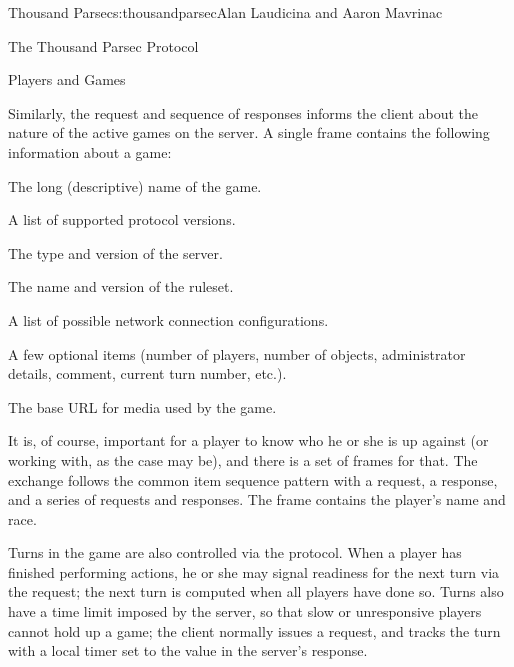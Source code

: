 \begin{aosachapter}{Thousand Parsec}{s:thousandparsec}{Alan Laudicina and Aaron Mavrinac}
\begin{aosasect1}{The Thousand Parsec Protocol}
\begin{aosasect2}{Players and Games}
\begin{aosaitemize}
\end{aosaitemize}

Similarly, the  request and sequence of 
responses informs the client about the nature of the active games on
the server. A single  frame contains the following
information about a game:

\begin{aosaitemize}

  \item The long (descriptive) name of the game.

  \item A list of supported protocol versions.

  \item The type and version of the server.

  \item The name and version of the ruleset.

  \item A list of possible network connection configurations.

  \item A few optional items (number of players, number of objects,
  administrator details, comment, current turn number, etc.).

  \item The base URL for media used by the game.

\end{aosaitemize}

It is, of course, important for a player to know who he or she is up
against (or working with, as the case may be), and there is a set of
frames for that. The exchange follows the common item sequence pattern
with a  request, a 
response, and a series of  requests and
 responses. The  frame contains
the player's name and race.

Turns in the game are also controlled via the protocol. When a player
has finished performing actions, he or she may signal readiness for
the next turn via the  request; the next turn is
computed when all players have done so. Turns also have a time limit
imposed by the server, so that slow or unresponsive players cannot
hold up a game; the client normally issues a 
request, and tracks the turn with a local timer set to the value in
the server's  response.


\end{aosasect2}
\end{aosasect1}
\end{aosachapter}
